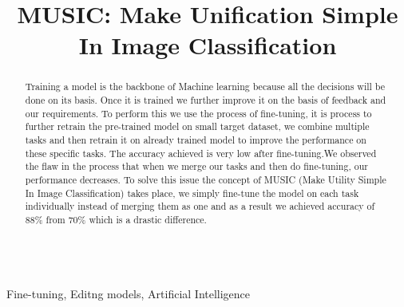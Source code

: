 \documentclass[conference]{IEEEtran}
\begin{document}
\title{MUSIC: Make Unification Simple In Image Classification \\}

\author{
}



\maketitle

\begin{abstract}
Training a model is the backbone of Machine learning because all the decisions will be done on its basis. Once it is trained we further improve it on the basis of feedback and our requirements. To perform this we use the process of fine-tuning, it is process to further retrain the pre-trained model on small target dataset, we combine multiple tasks and then retrain it on already trained model to improve the performance on these specific tasks. The accuracy achieved is very low after fine-tuning.We observed the flaw in the process that when we merge our tasks and then do fine-tuning, our performance decreases. To solve this issue the concept of MUSIC (Make Utility Simple In Image Classification) takes place, we simply fine-tune the model on each task individually instead of merging them as one and as a result we achieved accuracy of 88\% from 70\% which is a drastic difference. 
\end{abstract}

\begin{IEEEkeywords}
\vspace{0.5cm} \\ Fine-tuning, Editng models, Artificial Intelligence
\end{IEEEkeywords}
\end{document}
